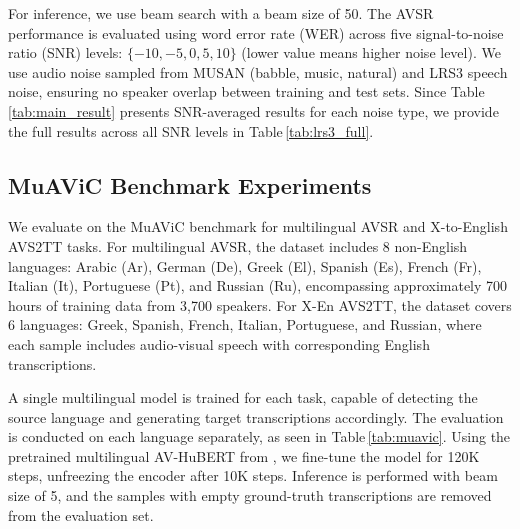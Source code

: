 For inference, we use beam search with a beam size of 50. The AVSR performance is evaluated using word error rate (WER) across five signal-to-noise ratio (SNR) levels: $\{-10, -5, 0, 5, 10\}$ (lower value means higher noise level). We use audio noise sampled from MUSAN (babble, music, natural) and LRS3 speech noise, ensuring no speaker overlap between training and test sets. Since Table\,\ref{tab:main_result} presents SNR-averaged results for each noise type, we provide the full results across all SNR levels in Table\,\ref{tab:lrs3_full}.


\subsection{MuAViC Benchmark Experiments}
\label{appx:muavic_benchmark}

We evaluate \ourmodel on the MuAViC benchmark \cite{anwar2023muavic} for multilingual AVSR and X-to-English AVS2TT tasks. For multilingual AVSR, the dataset includes 8 non-English languages: Arabic (Ar), German (De), Greek (El), Spanish (Es), French (Fr), Italian (It), Portuguese (Pt), and Russian (Ru), encompassing approximately 700 hours of training data from 3,700 speakers. For X-En AVS2TT, the dataset covers 6 languages: Greek, Spanish, French, Italian, Portuguese, and Russian, where each sample includes audio-visual speech with corresponding English transcriptions.

A single multilingual model is trained for each task, capable of detecting the source language and generating target transcriptions accordingly. The evaluation is conducted on each language separately, as seen in Table\,\ref{tab:muavic}. Using the pretrained multilingual AV-HuBERT from \citep{choi2024av2av}, we fine-tune the model for 120K steps, unfreezing the encoder after 10K steps. Inference is performed with beam size of 5, and the samples with empty ground-truth transcriptions are removed from the evaluation set. 





\clearpage